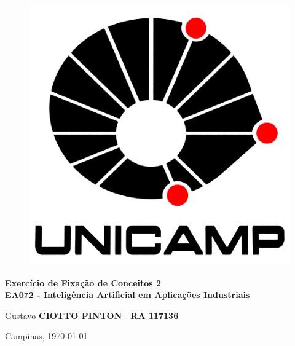 \begin{titlepage}
\vspace*{.28\textheight}
\begin{center}
%
\begin{figure}[h]
    \centering
    \includegraphics[scale=0.18]{image/LogoUnicamp}
\end{figure} 
%
\vspace*{10pt}
\textbf{\LARGE Exercício de Fixação de Conceitos 2} \\ \vspace{12pt}
\textbf{\large EA072 - Inteligência Artificial em Aplicações Industriais}
\vspace*{72pt}

Gustavo \textbf{CIOTTO PINTON} - \textbf{RA 117136}
 

Campinas, \today

\end{center}
\end{titlepage}

\newpage
